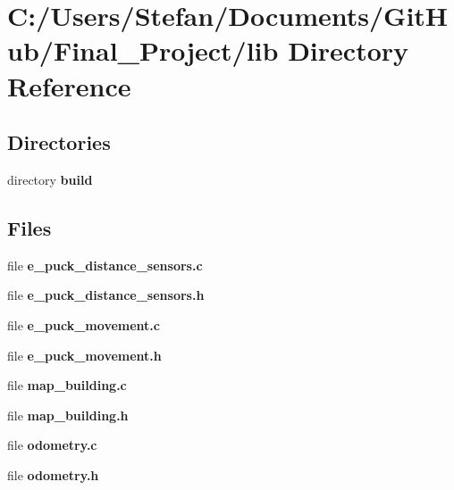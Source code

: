 \section{C\-:/\-Users/\-Stefan/\-Documents/\-Git\-Hub/\-Final\-\_\-\-Project/lib Directory Reference}
\label{dir_783716f39f3be2b206cf8f00b0340903}
\subsection*{Directories}
\begin{DoxyCompactItemize}
\item 
directory {\bf build}
\end{DoxyCompactItemize}
\subsection*{Files}
\begin{DoxyCompactItemize}
\item 
file {\bf e\-\_\-puck\-\_\-distance\-\_\-sensors.\-c}
\item 
file {\bf e\-\_\-puck\-\_\-distance\-\_\-sensors.\-h}
\item 
file {\bf e\-\_\-puck\-\_\-movement.\-c}
\item 
file {\bf e\-\_\-puck\-\_\-movement.\-h}
\item 
file {\bf map\-\_\-building.\-c}
\item 
file {\bf map\-\_\-building.\-h}
\item 
file {\bf odometry.\-c}
\item 
file {\bf odometry.\-h}
\end{DoxyCompactItemize}
